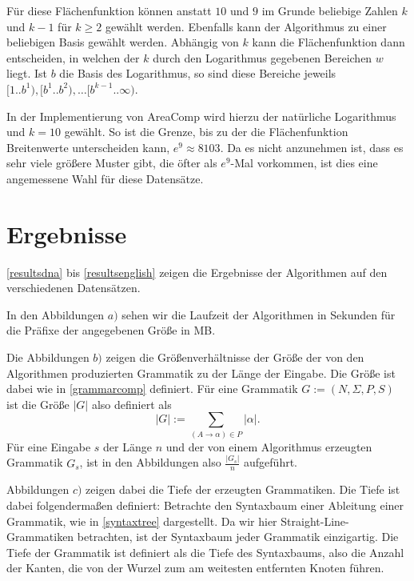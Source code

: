 \begin{itemize}[leftmargin=3.6cm]
    Für diese Flächenfunktion können anstatt $10$ und $9$ im Grunde beliebige Zahlen $k$ und $k - 1$ für $k \geq 2$ gewählt werden. Ebenfalls kann der Algorithmus zu einer beliebigen Basis gewählt werden.
    Abhängig von $k$ kann die Flächenfunktion dann entscheiden, in welchen der $k$ durch den Logarithmus gegebenen Bereichen $w$ liegt. Ist $b$ die Basis des Logarithmus, so sind diese Bereiche jeweils $[1..b^1), [b^1..b^2), \dots [b^{k-1}..\infty)$. 

    In der Implementierung von AreaComp wird hierzu der natürliche Logarithmus und $k = 10$ gewählt.
    So ist die Grenze, bis zu der die Flächenfunktion Breitenwerte unterscheiden kann, $e^9 \approx 8103$. Da es nicht anzunehmen ist, dass es sehr viele größere Muster gibt, die öfter als $e^9$-Mal vorkommen, ist dies eine angemessene Wahl für diese Datensätze.
\end{itemize}

\section{Ergebnisse}
\label{results}

\autoref{resultsdna} bis \ref{resultsenglish} zeigen die Ergebnisse der Algorithmen auf den verschiedenen Datensätzen. 

In den Abbildungen $a)$ sehen wir die Laufzeit der Algorithmen in Sekunden für die Präfixe der angegebenen Größe in MB.

Die Abbildungen $b)$ zeigen die Größenverhältnisse der Größe der von den Algorithmen produzierten Grammatik zu der Länge der Eingabe. Die Größe ist dabei wie in \autoref{grammarcomp} definiert. Für eine Grammatik $G :=(N, \Sigma, P, S)$ ist die Größe $|G|$ also definiert als
\begin{equation*}
	|G| := \sum_{(A \rightarrow \alpha) \in P} |\alpha|.
\end{equation*}
Für eine Eingabe $s$ der Länge $n$ und der von einem Algorithmus erzeugten Grammatik $G_s$, ist in den Abbildungen also $\tfrac{|G_s|}{n}$ aufgeführt.

Abbildungen $c)$ zeigen dabei die Tiefe der erzeugten Grammatiken. Die Tiefe ist dabei folgendermaßen definiert: Betrachte den Syntaxbaum einer Ableitung einer Grammatik, wie in \autoref{syntaxtree} dargestellt. Da wir hier Straight-Line-Grammatiken betrachten, ist der Syntaxbaum jeder Grammatik einzigartig. Die Tiefe der Grammatik ist definiert als die Tiefe des Syntaxbaums, also die Anzahl der Kanten, die von der Wurzel zum am weitesten entfernten Knoten führen.  

